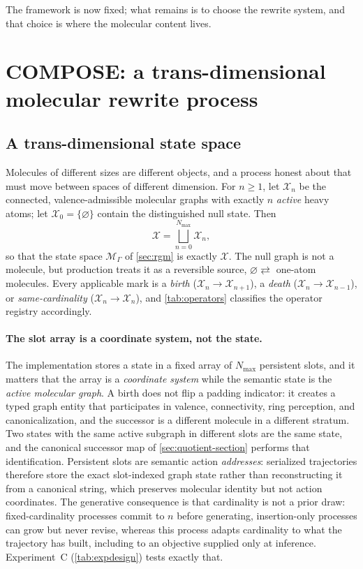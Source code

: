 \documentclass{article}
\newcommand{\M}{\mathcal{M}_{\Gamma}}
\newcommand{\X}{\mathcal{X}}
\theoremstyle{definition}
\theoremstyle{remark}
\begin{document}
The framework is now fixed; what remains is to choose the rewrite system, and that choice is where the molecular content lives.

\section{COMPOSE: a trans-dimensional molecular rewrite process}
\label{sec:compose}

\subsection{A trans-dimensional state space}
\label{sec:transdim}

Molecules of different sizes are different objects, and a process honest about that must move between spaces of different dimension. For $n\ge1$, let $\X_n$ be the connected, valence-admissible molecular graphs with exactly $n$ \emph{active} heavy atoms; let $\X_0=\{\varnothing\}$ contain the distinguished null state. Then
\begin{equation}
\X=\bigsqcup_{n=0}^{N_{\max}}\X_n,
\label{eq:transdim}
\end{equation}
so that the state space $\M$ of \cref{sec:rgm} is exactly $\X$. The null graph is not a molecule, but production treats it as a reversible source, $\varnothing\rightleftarrows$ one-atom molecules. Every applicable mark is a \emph{birth} ($\X_n\to\X_{n+1}$), a \emph{death} ($\X_n\to\X_{n-1}$), or \emph{same-cardinality} ($\X_n\to\X_n$), and \cref{tab:operators} classifies the operator registry accordingly.

\paragraph{The slot array is a coordinate system, not the state.}
The implementation stores a state in a fixed array of $N_{\max}$ persistent slots, and it matters that the array is a \emph{coordinate system} while the semantic state is the \emph{active molecular graph}. A birth does not flip a padding indicator: it creates a typed graph entity that participates in valence, connectivity, ring perception, and canonicalization, and the successor is a different molecule in a different stratum. Two states with the same active subgraph in different slots are the same state, and the canonical successor map of \cref{sec:quotient-section} performs that identification. Persistent slots are semantic action \emph{addresses}: serialized trajectories therefore store the exact slot-indexed graph state rather than reconstructing it from a canonical string, which preserves molecular identity but not action coordinates. The generative consequence is that cardinality is not a prior draw: fixed-cardinality processes commit to $n$ before generating, insertion-only processes can grow but never revise, whereas this process adapts cardinality to what the trajectory has built, including to an objective supplied only at inference. Experiment~C (\cref{tab:expdesign}) tests exactly that.
\end{document}

